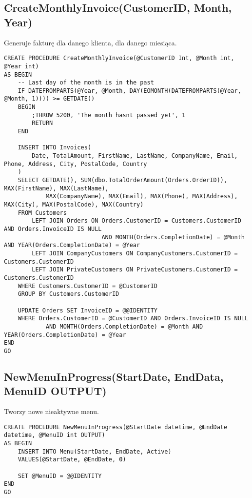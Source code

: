 \subsection{CreateMonthlyInvoice(CustomerID, Month, Year)}
Generuje fakturę dla danego klienta, dla danego miesiąca.
\begin{verbatim}
CREATE PROCEDURE CreateMonthlyInvoice(@CustomerID Int, @Month int, @Year int)
AS BEGIN
    -- Last day of the month is in the past
    IF DATEFROMPARTS(@Year, @Month, DAY(EOMONTH(DATEFROMPARTS(@Year, @Month, 1)))) >= GETDATE()
    BEGIN
        ;THROW 5200, 'The month hasnt passed yet', 1
        RETURN
    END

    INSERT INTO Invoices(
        Date, TotalAmount, FirstName, LastName, CompanyName, Email, Phone, Address, City, PostalCode, Country
    )
    SELECT GETDATE(), SUM(dbo.TotalOrderAmount(Orders.OrderID)), MAX(FirstName), MAX(LastName), 
            MAX(CompanyName), MAX(Email), MAX(Phone), MAX(Address), MAX(City), MAX(PostalCode), MAX(Country) 
    FROM Customers
        LEFT JOIN Orders ON Orders.CustomerID = Customers.CustomerID AND Orders.InvoiceID IS NULL
                            AND MONTH(Orders.CompletionDate) = @Month AND YEAR(Orders.CompletionDate) = @Year
        LEFT JOIN CompanyCustomers ON CompanyCustomers.CustomerID = Customers.CustomerID
        LEFT JOIN PrivateCustomers ON PrivateCustomers.CustomerID = Customers.CustomerID
    WHERE Customers.CustomerID = @CustomerID
    GROUP BY Customers.CustomerID

    UPDATE Orders SET InvoiceID = @@IDENTITY
    WHERE Orders.CustomerID = @CustomerID AND Orders.InvoiceID IS NULL
            AND MONTH(Orders.CompletionDate) = @Month AND YEAR(Orders.CompletionDate) = @Year
END
GO
\end{verbatim}
\subsection{NewMenuInProgress(StartDate, EndData, MenuID OUTPUT)}
Tworzy nowe nieaktywne menu.
\begin{verbatim}
CREATE PROCEDURE NewMenuInProgress(@StartDate datetime, @EndDate datetime, @MenuID int OUTPUT)
AS BEGIN
    INSERT INTO Menu(StartDate, EndDate, Active)
    VALUES(@StartDate, @EndDate, 0)
    
    SET @MenuID = @@IDENTITY
END
GO
\end{verbatim}
